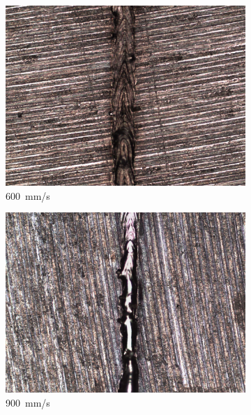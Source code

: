 \documentclass{article}
\begin{document}
\begin{figure}
\begin{subfigure}[b]{0.24\textwidth}
        \includegraphics[width=\textwidth]{experiment/photos/90W_V600}
        \caption{\SI{600}{mm/s}}
    \end{subfigure}\:
    \begin{subfigure}[b]{0.24\textwidth}
        \includegraphics[width=\textwidth]{experiment/photos/90W_V900}
        \caption{\SI{900}{mm/s}}
    \end{subfigure}\\[6pt]
    \begin{subfigure}[b]{0.24\textwidth}

\end{subfigure}
\end{figure}
\end{document}
